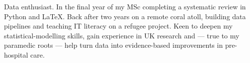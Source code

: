 \documentclass[9pt]{developercv} %
\begin{document}
\vspace{0.3cm} %


\begin{minipage}[t]{0.6\textwidth} %
	\vspace{-\baselineskip} %
	\vspace{-0.5em}

	Data enthusiast. In the final year of my MSc completing a systematic review in Python and LaTeX. Back after two years on a remote coral atoll, building data pipelines and teaching IT literacy on a refugee project. Keen to deepen my statistical-modelling skills, gain experience in UK research and — true to my paramedic roots — help turn data into evidence-based improvements in pre-hospital care.
	\\ %
\end{minipage}
\hfill %
\begin{minipage}[t]{0.38\textwidth} %
	\vspace{-\baselineskip} %
	
	\begin{barchart}{5.5} %
	\end{barchart}
\end{minipage}

\end{document}
